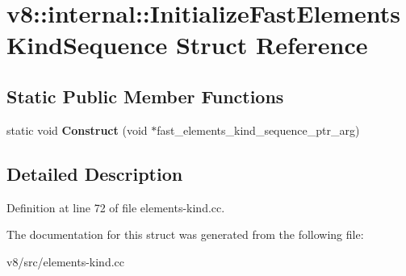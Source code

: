 \hypertarget{structv8_1_1internal_1_1InitializeFastElementsKindSequence}{}\section{v8\+:\+:internal\+:\+:Initialize\+Fast\+Elements\+Kind\+Sequence Struct Reference}
\label{structv8_1_1internal_1_1InitializeFastElementsKindSequence}
\subsection*{Static Public Member Functions}
\begin{DoxyCompactItemize}
\item 
\mbox{\label{structv8_1_1internal_1_1InitializeFastElementsKindSequence_a78defb98db72d6180f15b8df4eb55588}} 
static void {\bfseries Construct} (void $\ast$fast\+\_\+elements\+\_\+kind\+\_\+sequence\+\_\+ptr\+\_\+arg)
\end{DoxyCompactItemize}


\subsection{Detailed Description}


Definition at line 72 of file elements-\/kind.\+cc.



The documentation for this struct was generated from the following file\+:\begin{DoxyCompactItemize}
\item 
v8/src/elements-\/kind.\+cc\end{DoxyCompactItemize}
